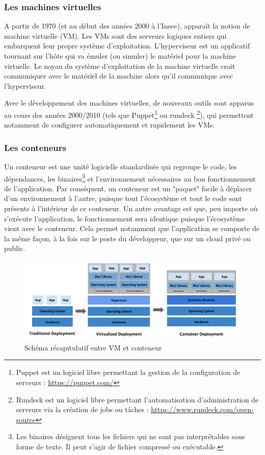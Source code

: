 \documentclass[11pt,fleqn]{book} %
\begin{document}
\subsubsection{Les machines virtuelles}
A partir de 1970 (et au début des années 2000 à l'Insee), apparaît  la notion de machine virtuelle (VM). Les VMs sont des serveurs logiques entiers qui embarquent leur propre système d’exploitation. L’hyperviseur est un applicatif tournant sur l’hôte qui va émuler (ou simuler) le matériel pour la machine virtuelle. Le noyau du système d’exploitation de la machine virtuelle croit communiquer avec le matériel de la machine alors qu’il communique avec l’hyperviseur.

Avec le développement des machines virtuelles, de nouveaux outils sont apparus au cours des années 2000/2010 (tels que Puppet\footnote{Puppet est un logiciel libre permettant la gestion de la configuration de serveurs : \url{https://puppet.com/}} ou rundeck \footnote{Rundeck est un logiciel libre permettant l'automatisation d'administration de serveurs via la création de jobs ou tâches : \url{https://www.rundeck.com/open-source}}), qui permettent notamment de configurer automatiquement et rapidement les VMs.


\subsubsection{Les conteneurs}
Un conteneur est une unité logicielle standardisée qui regroupe le code, les dépendances, les binaires\footnote{Les binaires désignent tous les fichiers qui ne sont pas interprétables sous forme de texte. Il peut s'agir de fichier compressé ou exécutable.} et l'environnement nécessaires au bon fonctionnement de l'application. Par conséquent, un conteneur est un "paquet" facile à déplacer d'un environnement à l'autre, puisque tout l'écosystème et tout le code sont présents à l'intérieur de ce conteneur. Un autre avantage est que, peu importe où s'exécute l'application, le fonctionnement sera identique puisque l'écosystème vient avec le conteneur. Cela permet notamment que l'application se comporte de la même façon, à la fois sur le poste du développeur, que sur un cloud privé ou public. \\




\begin{figure}[H]\centering
\renewcommand{\figurename}{Schéma}
\includegraphics[scale=0.3]{Pictures/container_evolution.png}
\captionsetup{margin=1.5cm,format=hang,justification=justified}
\caption[]{Schéma récapitulatif entre VM et conteneur \newline}
\end{figure}
\end{document}
